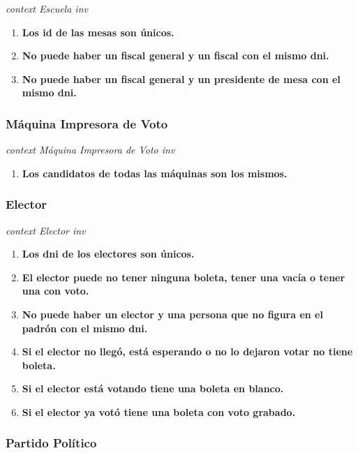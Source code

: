 \textit{context Escuela
inv}

\begin{enumerate}
\item \textbf{Los id de las mesas son únicos.}
\item \textbf{No puede haber un fiscal general y un fiscal con el mismo dni.}
\item \textbf{No puede haber un fiscal general y un presidente de mesa con el mismo dni.}
\end{enumerate}

\subsubsection*{M\'aquina Impresora de Voto}

\textit{context M\'aquina Impresora de Voto
inv}

\begin{enumerate}
\item \textbf{Los candidatos de todas las máquinas son los mismos.}

\end{enumerate}

\subsubsection*{Elector}

\textit{context Elector
inv}

\begin{enumerate}
\item \textbf{Los dni de los electores son únicos.}
\item \textbf{El elector puede no tener ninguna boleta, tener una vacía o tener una con voto.}
\item \textbf{No puede haber un elector y una persona que no figura en el padrón con el mismo dni.}
\item \textbf{Si el elector no llegó, está esperando o no lo dejaron votar no tiene boleta.}
\item \textbf{Si el elector está votando tiene una boleta en blanco.}
\item \textbf{Si el elector ya votó tiene una boleta con voto grabado.}
\end{enumerate}

\subsubsection*{Partido Pol\'itico}

